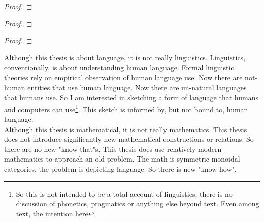 \begin{proposition}

\begin{proof}

\end{proof}
\end{proposition}


\begin{proposition}

\begin{proof}

\end{proof}
\end{proposition}

\begin{rem}

\end{rem}

\begin{proposition}

\begin{proof}

\end{proof}
\end{proposition}



Although this thesis is about language, it is not really linguistics.
Linguistics, conventionally, is about understanding human language.
Formal linguistic theories rely on empirical observation of human language use.
Now there are not-human entities that use human language.
Now there are un-natural languages that humans use.
So I am interested in sketching a form of language that humans and computers can use\footnote{So this is not intended to be a total account of linguistics; there is no discussion of phonetics, pragmatics or anything else beyond text. Even among text, the intention here}.
This sketch is informed by, but not bound to, human language.\\

Although this thesis is mathematical, it is not really mathematics.
This thesis does not introduce significantly new mathematical constructions or relations.
So there are no new "know that"s.
This thesis does use relatively modern mathematics to approach an old problem.
The math is symmetric monoidal categories, the problem is depicting language.
So there is new "know how".\\

